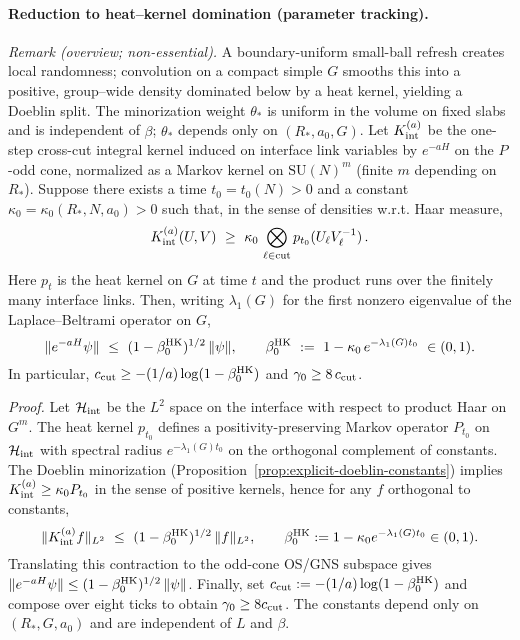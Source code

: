 \documentclass[11pt]{amsart}
\theoremstyle{plain}
\theoremstyle{definition}
\theoremstyle{remark}
\begin{document}
\paragraph{Reduction to heat--kernel domination (parameter tracking).} \emph{Remark (overview; non-essential).} A boundary-uniform small-ball refresh creates local randomness; convolution on a compact simple $G$ smooths this into a positive, group--wide density dominated below by a heat kernel, yielding a Doeblin split. The minorization weight $\theta_*$ is uniform in the volume on fixed slabs and is independent of $\beta$; $\theta_*$ depends only on $(R_*,a_0,G)$.
Let $K_{\rm int}^{(a)}$ be the one-step cross-cut integral kernel induced on interface link variables by $e^{-aH}$ on the $P$-odd cone, normalized as a Markov kernel on $\mathrm{SU}(N)^m$ (finite $m$ depending on $R_*$). Suppose there exists a time $t_0=t_0(N)>0$ and a constant $\kappa_0=\kappa_0(R_*,N,a_0)>0$ such that, in the sense of densities w.r.t. Haar measure,
\[
  K_{\rm int}^{(a)}(U,V)\ \ge\ \kappa_0\,\bigotimes_{\ell\in \text{cut}} p_{t_0}(U_\ell V_\ell^{-1})\,.
\]
Here $p_{t}$ is the heat kernel on $G$ at time $t$ and the product runs over the finitely many interface links. Then, writing $\lambda_1(G)$ for the first nonzero eigenvalue of the Laplace--Beltrami operator on $G$,
\[
  \|e^{-aH}\psi\|\ \le\ (1-\beta_0^{\rm HK})^{1/2}\,\|\psi\|,\qquad
  \beta_0^{\rm HK}\ :=\ 1-\kappa_0\,e^{-\lambda_1(G) t_0}\ \in (0,1).
\]
In particular, $c_{\rm cut}\ge -(1/a)\log(1-\beta_0^{\rm HK})$ and $\gamma_0\ge 8\,c_{\rm cut}$.

\emph{Proof.} Let $\mathcal H_{\rm int}$ be the $L^2$ space on the interface with respect to product Haar on $G^m$. The heat kernel $p_{t_0}$ defines a positivity-preserving Markov operator $P_{t_0}$ on $\mathcal H_{\rm int}$ with spectral radius $e^{-\lambda_1(G) t_0}$ on the orthogonal complement of constants. The Doeblin minorization (Proposition~\ref{prop:explicit-doeblin-constants}) implies $K_{\rm int}^{(a)} \ge \kappa_0 P_{t_0}$ in the sense of positive kernels, hence for any $f$ orthogonal to constants,
\[
  \|K_{\rm int}^{(a)} f\|_{L^2}\ \le\ (1-\beta_0^{\rm HK})^{1/2}\,\|f\|_{L^2},\qquad \beta_0^{\rm HK}:=1-\kappa_0 e^{-\lambda_1(G) t_0}\in(0,1).
\]
Translating this contraction to the odd-cone OS/GNS subspace gives $\|e^{-aH}\psi\|\le (1-\beta_0^{\rm HK})^{1/2}\,\|\psi\|$. Finally, set $c_{\rm cut}:=-(1/a)\log(1-\beta_0^{\rm HK})$ and compose over eight ticks to obtain $\gamma_0\ge 8 c_{\rm cut}$. The constants depend only on $(R_*,G,a_0)$ and are independent of $L$ and $\beta$.
\end{document}
